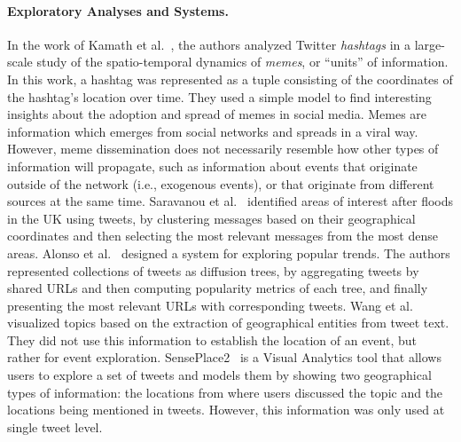 \paragraph{Exploratory Analyses and Systems.}
%
In the work of Kamath et al.~\cite{Kamath:2013:SDO:2488388.2488447}, the authors
analyzed Twitter \emph{hashtags} in a large-scale study of the spatio-temporal
dynamics of {\em memes}, or ``units'' of information. 
%
In this work, a hashtag was represented as a tuple consisting of the coordinates
of the hashtag's location over time. 
%
They used a simple model to find interesting insights about the adoption and
spread of memes in social media. 
%
Memes are information which emerges from social networks and spreads in a viral
way. 
%
However, meme dissemination does not necessarily resemble how other types of
information will propagate, such as information about events that originate
outside of the network (i.e., exogenous events), or that originate from
different sources at the same time.
%
Saravanou et al.~\cite{Saravanou:Twitter:2015} identified areas of interest
after floods in the UK using tweets, by clustering messages based on their
geographical coordinates and then selecting the most relevant messages from the
most dense areas.
%
Alonso et al.~\cite{Alonso:2017:WHH:3091478.3091484} designed a system for
exploring popular trends. 
%
The authors represented collections of tweets as diffusion trees, by
aggregating tweets by shared URLs and then computing popularity metrics of each
tree, and finally presenting the most relevant URLs with corresponding tweets.
%
Wang et al.~\cite{Wang:LeadLine:2012} visualized topics based on the extraction
of geographical entities from tweet text. 
%
They did not use this information to establish the location of an event, but
rather for event exploration.
%
SensePlace2~\cite{MacEachren:SensePlace2:2011} is a Visual Analytics tool that
allows users to explore a set of tweets and models them by showing two
geographical types of information: the locations from where users discussed the
topic and the locations being mentioned in tweets. 
%
However, this information was only used at single tweet level.


